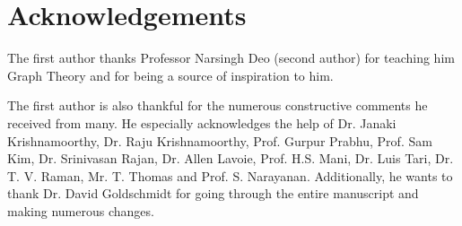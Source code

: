 \chapter*{Acknowledgements}
The first author thanks Professor Narsingh Deo (second author) for teaching him Graph Theory and for being a source of inspiration to him.

The first author is also thankful for the numerous constructive comments he received from many. He especially acknowledges the help of Dr. Janaki Krishnamoorthy, Dr. Raju Krishnamoorthy, Prof. Gurpur Prabhu, Prof. Sam Kim, Dr. Srinivasan Rajan, Dr. Allen Lavoie, Prof. H.S. Mani, Dr. Luis Tari, Dr. T. V. Raman, Mr. T. Thomas and Prof. S. Narayanan. Additionally, he wants to thank Dr. David Goldschmidt for going through the entire manuscript and making numerous changes.


